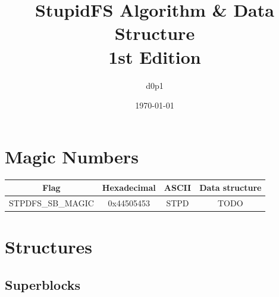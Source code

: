 \documentclass[a4paper, 12pt, openright, english]{scrbook}
\date{\today}
\title{%
	StupidFS Algorithm \& Data Structure \\
	\large 1st Edition}
\author{d0p1}
\begin{document}
	\frontmatter
	
	\maketitle
	\tableofcontents

	\mainmatter

	\chapter{Magic Numbers}

	\begin{center}
		\begin{tabular}{ |c|c|c|c| } 
 			\hline
 			\textbf{Flag} & \textbf{Hexadecimal} & \textbf{ASCII} & \textbf{Data structure}  \\ 
			\hline
 			STPDFS\_SB\_MAGIC & 0x44505453 & STPD & TODO \\ 
 			\hline
		\end{tabular}
	\end{center}

	\chapter{Structures}

	\section{Superblocks}

	

	\appendix
\end{document}
